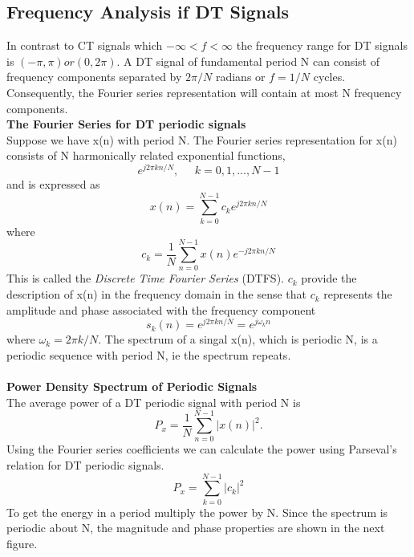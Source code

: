 \documentclass{article} %
\begin{document}
	\subsection{Frequency Analysis if DT Signals}
	In contrast to CT signals which $-\infty < f < \infty$ the frequency range for DT signals is $(-\pi , \pi) or (0, 2\pi)$. A DT signal of
	fundamental period N can consist of frequency components separated by $2\pi /N$ radians or $f = 1/N$ cycles. Consequently,
	the Fourier series representation will contain at most N frequency components. \\
	\textbf{The Fourier Series for DT periodic signals}\\
	Suppose we have x(n) with period N. The Fourier series representation for x(n) consists of N harmonically related exponential functions,
	\begin{equation}
	e^{j2\pi kn/N}, \;\;\;\;\; k = 0,1, ..., N-1
	\end{equation}
	and is expressed as
	\begin{equation}
	x(n) = \sum_{k=0}^{N-1}c_ke^{j2\pi kn/N}
	\end{equation}
	where 
	\begin{equation}
	c_k = \frac{1}{N}\sum_{n=0}^{N-1}x(n)e^{-j2\pi kn/N}
	\end{equation}
	This is called the \textit{Discrete Time Fourier Series} (DTFS). $c_k$ provide the description of x(n) in the frequency domain
	in the sense that $c_k$ represents the amplitude and phase associated with the frequency component
	\begin{equation}
	s_k(n) = e^{j2\pi kn/N} = e^{j\omega_k n}
	\end{equation}
	where $\omega_k = 2\pi k/N$. The spectrum of a singal x(n), which is periodic N, is a periodic sequence with period N, ie the 
	spectrum repeats.
	\\
	\\
	\textbf{Power Density Spectrum of Periodic Signals}\\
	The average power of a DT periodic signal with period N is
	\begin{equation}
	P_x = \frac{1}{N}\sum_{n=0}^{N-1}|x(n)|^2.
	\end{equation}
	Using the Fourier series coefficients we can calculate the power using Parseval's relation for DT periodic signals.
	\begin{equation}
	P_x = \sum_{k=0}^{N-1}|c_k|^2
	\end{equation}
	To get the energy in a period multiply the power by N. Since the spectrum is periodic about N, the magnitude and phase properties are shown
	in the next figure.
\end{document}
